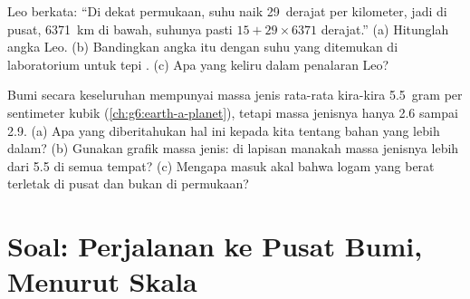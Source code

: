\begin{exercise}[$\star\star\star$]\label{exo:g6:inside-the-earth:11}
Leo berkata: ``Di dekat permukaan, suhu naik 29~derajat per kilometer, jadi
di pusat, 6371~km di bawah, suhunya pasti $15 + 29 \times 6371$ derajat.''
(a) Hitunglah angka Leo. (b) Bandingkan angka itu dengan suhu yang
ditemukan di laboratorium untuk tepi . (c) Apa yang keliru dalam
penalaran Leo?
\end{exercise}

\begin{exercise}[$\star\star\star$]\label{exo:g6:inside-the-earth:12}
Bumi secara keseluruhan mempunyai massa jenis rata-rata kira-kira 5.5~gram
per sentimeter kubik (\cref{ch:g6:earth-a-planet}), tetapi  
massa jenisnya hanya 2.6 sampai 2.9. (a) Apa yang diberitahukan hal ini
kepada kita tentang bahan yang lebih dalam? (b) Gunakan grafik massa jenis:
di lapisan manakah massa jenisnya lebih dari 5.5 di semua tempat?
(c) Mengapa masuk akal bahwa logam yang berat terletak di pusat dan bukan
di permukaan?
\end{exercise}

\section{Soal: Perjalanan ke Pusat Bumi, Menurut Skala}

